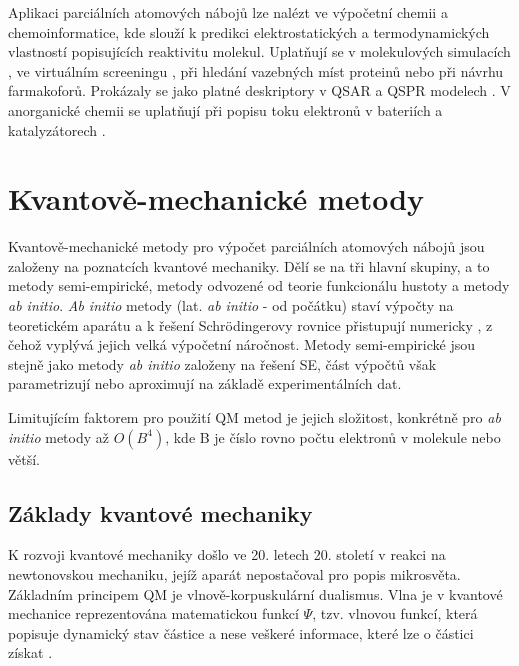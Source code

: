 Aplikaci parciálních atomových nábojů lze nalézt ve výpočetní chemii a chemoinformatice, kde slouží k predikci elektrostatických a termodynamických vlastností popisujících reaktivitu molekul. Uplatňují se v molekulových simulacích \cite{molsimul}, ve virtuálním screeningu \cite{virtscreen}, při hledání vazebných míst proteinů nebo při návrhu farmakoforů. Prokázaly se jako platné deskriptory v QSAR a QSPR modelech \cite{Ghaf:QSAR, Karel:QSAR+QSPR}. V anorganické chemii se uplatňují při popisu toku elektronů v bateriích a katalyzátorech \cite{innorg}. 


\section{Kvantově-mechanické metody}
Kvantově-mechanické metody pro výpočet parciálních atomových nábojů jsou založeny na poznatcích kvantové mechaniky. Dělí se na tři hlavní skupiny, a to metody semi-empirické, metody odvozené od teorie funkcionálu hustoty a metody \textit{ab initio}. \textit{Ab initio} metody (lat. \textit{ab initio} - od počátku) staví výpočty na teoretickém aparátu a k řešení Schrödingerovy rovnice přistupují numericky%
, z čehož vyplývá jejich velká výpočetní náročnost. Metody semi-empirické jsou stejně jako metody \textit{ab initio} založeny na řešení SE, část výpočtů však parametrizují nebo aproximují na základě experimentálních dat.

Limitujícím faktorem pro použití QM metod je jejich složitost, konkrétně pro \textit{ab initio} metody až $O(B^4)$, kde B je číslo rovno počtu elektronů v molekule nebo větší. 

\subsection{Základy kvantové mechaniky}
K rozvoji kvantové mechaniky došlo ve 20. letech 20. století v reakci na newtonovskou mechaniku, jejíž aparát nepostačoval pro popis mikrosvěta.  
Základním principem QM je vlnově-korpuskulární dualismus. %
Vlna je v kvantové mechanice reprezentována matematickou funkcí $\Psi$, tzv. vlnovou funkcí, která popisuje dynamický stav částice a nese veškeré informace, které lze o částici získat \cite{Cely}. %

